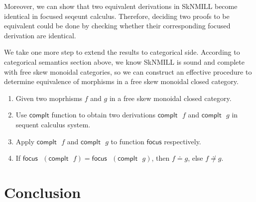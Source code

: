 \documentclass[submission,copyright,creativecommons]{eptcs}
\newtheorem{theorem}{Theorem}
\newcommand{\RI}{\mathsf{RI}}
\begin{document}
Moreover, we can show that two equivalent derivations in SkNMILL become identical in focused seqeunt calculus.
Therefore, deciding two proofs to be equivalent could be done by checking whether their corresponding focused derivation are identical.

We take one more step to extend the results to categorical side.
According to categorical semantics section above, we know SkNMILL is sound and complete with free skew monoidal categories, so we can construct an effective procedure to determine equivalence of morphisms in a free skew monoidal closed category.
\begin{enumerate}
  \item Given two moprhisms $f$ and $g$ in a free skew monoidal closed category.
  \item Use $\mathsf{complt}$ function to obtain two derivations $\mathsf{complt} \text{ } f$ and $\mathsf{complt} \text{ } g$ in sequent calculus system.
  \item Apply $\mathsf{complt} \text{ } f$ and $\mathsf{complt} \text{ } g$ to function $\mathsf{focus}$ respectively.
  \item If $\mathsf{focus} \text{ } (\mathsf{complt} \text{ } f) = \mathsf{focus} \text{ } (\mathsf{complt} \text{ } g)$, then $f \doteq g$, else $f \not\doteq g$.
\end{enumerate}


\section{Conclusion}

  
  
\end{document}
